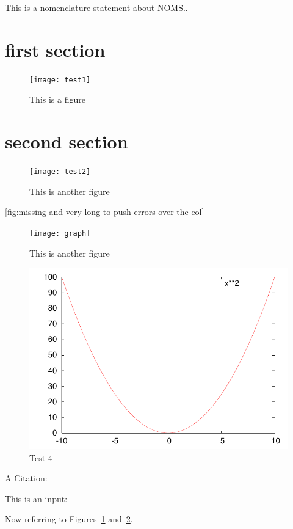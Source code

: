 \documentclass[
    letterpaper %
]{article}
\begin{document}
This is a nomenclature statement about NOMS..

\tableofcontents
\listoffigures

\section{first section}


\nocite{testentry3}

\begin{figure}
\centering
    \texttt{[image: test1]}
\caption{This is a figure}
\label{fig:test1}
\end{figure}

\section{second section}

\begin{figure}
\centering
    \texttt{[image: test2]}
\caption{This is another figure}
\label{fig:test2}
\end{figure}

\ref{fig:missing-and-very-long-to-push-errors-over-the-eol}

\begin{figure}
\centering
    \texttt{[image: graph]}
\caption{This is another figure}
\label{fig:test3}
\end{figure}

\begin{figure}
\centering
    \includegraphics[width=\textwidth]{test4}
\caption{Test 4}
\label{fig:test4}
\end{figure}

A Citation: \cite{testentry}

This is an input: {}




Now referring to Figures~\ref{fig:test1} and~\ref{fig:test2}.
\end{document}
